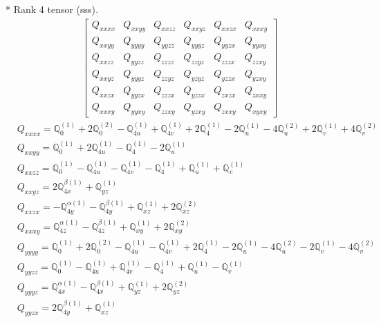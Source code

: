 \documentclass[fleqn,8pt,landscape]{jsarticle}
\begin{document}
* Rank 4 tensor (sss).
\begin{align*}
\begin{bmatrix} Q_{xxxx} & Q_{xxyy} & Q_{xxzz} & Q_{xxyz} & Q_{xxzx} & Q_{xxxy} \\ Q_{xxyy} & Q_{yyyy} & Q_{yyzz} & Q_{yyyz} & Q_{yyzx} & Q_{yyxy} \\ Q_{xxzz} & Q_{yyzz} & Q_{zzzz} & Q_{zzyz} & Q_{zzzx} & Q_{zzxy} \\ Q_{xxyz} & Q_{yyyz} & Q_{zzyz} & Q_{yzyz} & Q_{yzzx} & Q_{yzxy} \\ Q_{xxzx} & Q_{yyzx} & Q_{zzzx} & Q_{yzzx} & Q_{zxzx} & Q_{zxxy} \\ Q_{xxxy} & Q_{yyxy} & Q_{zzxy} & Q_{yzxy} & Q_{zxxy} & Q_{xyxy} \end{bmatrix}
\end{align*}
\begin{align*}
& Q_{xxxx} = \mathbb{Q}_{0}^{(1)} + 2 \mathbb{Q}_{0}^{(2)} - \mathbb{Q}_{4u}^{(1)} + \mathbb{Q}_{4v}^{(1)} + 2 \mathbb{Q}_{4}^{(1)} - 2 \mathbb{Q}_{u}^{(1)} - 4 \mathbb{Q}_{u}^{(2)} + 2 \mathbb{Q}_{v}^{(1)} + 4 \mathbb{Q}_{v}^{(2)} \\
& Q_{xxyy} = \mathbb{Q}_{0}^{(1)} + 2 \mathbb{Q}_{4u}^{(1)} - \mathbb{Q}_{4}^{(1)} - 2 \mathbb{Q}_{u}^{(1)} \\
& Q_{xxzz} = \mathbb{Q}_{0}^{(1)} - \mathbb{Q}_{4u}^{(1)} - \mathbb{Q}_{4v}^{(1)} - \mathbb{Q}_{4}^{(1)} + \mathbb{Q}_{u}^{(1)} + \mathbb{Q}_{v}^{(1)} \\
& Q_{xxyz} = 2 \mathbb{Q}_{4x}^{\beta(1)} + \mathbb{Q}_{yz}^{(1)} \\
& Q_{xxzx} = - \mathbb{Q}_{4y}^{\alpha(1)} - \mathbb{Q}_{4y}^{\beta(1)} + \mathbb{Q}_{xz}^{(1)} + 2 \mathbb{Q}_{xz}^{(2)} \\
& Q_{xxxy} = \mathbb{Q}_{4z}^{\alpha(1)} - \mathbb{Q}_{4z}^{\beta(1)} + \mathbb{Q}_{xy}^{(1)} + 2 \mathbb{Q}_{xy}^{(2)} \\
& Q_{yyyy} = \mathbb{Q}_{0}^{(1)} + 2 \mathbb{Q}_{0}^{(2)} - \mathbb{Q}_{4u}^{(1)} - \mathbb{Q}_{4v}^{(1)} + 2 \mathbb{Q}_{4}^{(1)} - 2 \mathbb{Q}_{u}^{(1)} - 4 \mathbb{Q}_{u}^{(2)} - 2 \mathbb{Q}_{v}^{(1)} - 4 \mathbb{Q}_{v}^{(2)} \\
& Q_{yyzz} = \mathbb{Q}_{0}^{(1)} - \mathbb{Q}_{4u}^{(1)} + \mathbb{Q}_{4v}^{(1)} - \mathbb{Q}_{4}^{(1)} + \mathbb{Q}_{u}^{(1)} - \mathbb{Q}_{v}^{(1)} \\
& Q_{yyyz} = \mathbb{Q}_{4x}^{\alpha(1)} - \mathbb{Q}_{4x}^{\beta(1)} + \mathbb{Q}_{yz}^{(1)} + 2 \mathbb{Q}_{yz}^{(2)} \\
& Q_{yyzx} = 2 \mathbb{Q}_{4y}^{\beta(1)} + \mathbb{Q}_{xz}^{(1)} \\

\end{align*}
\end{document}
